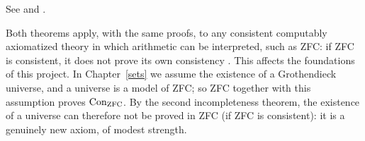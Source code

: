 See \cite{godel-1931} and \cite{smith-godel}.

\begin{remark}\label{logic:remark-incompleteness-set-theory}
Both theorems apply, with the same proofs, to any consistent computably
axiomatized theory in which arithmetic can be interpreted, such as ZFC:
if ZFC is consistent, it does not prove its own consistency
\cite{kunen-set-theory}. This affects the foundations of this project. In
Chapter~\ref{sets} we assume the existence of a Grothendieck universe, and a
universe is a model of ZFC; so ZFC together with this assumption proves
$\operatorname{Con}_{\mathrm{ZFC}}$. By the second incompleteness theorem, the existence of
a universe can therefore not be proved in ZFC (if ZFC is consistent): it is a
genuinely new axiom, of modest strength.
\end{remark}

